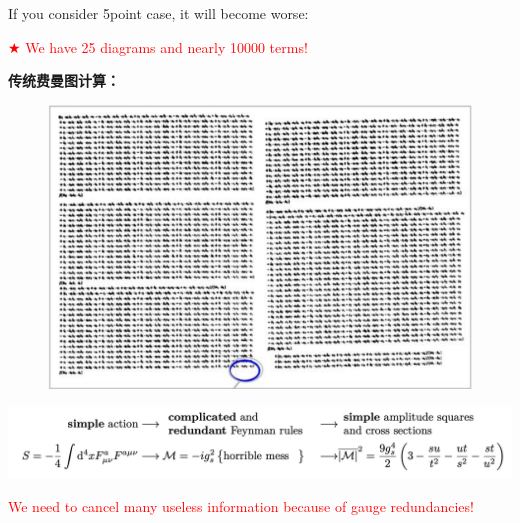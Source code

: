 \documentclass{beamer}
\begin{document}
\begin{frame}
If you consider 5point case, it will become worse:
\begin{center}
    \textcolor{red}{$\bigstar$ We have 25 diagrams and nearly 10000 terms!}
\end{center}
\vspace{-2em}

    \textbf{传统费曼图计算：}
    \begin{figure}
        \centering
        \includegraphics[width=0.5\linewidth]{5pt.png}
    \end{figure}
\vspace{-1.5em}
\pause
\begin{center}
\hspace*{-0.5em}\includegraphics[width=1.05\textwidth]{structure.png}
\end{center}
\vspace{-1.5em}
\pause
\hspace*{-0.5em}\textcolor{red}{We need to cancel many useless information because of gauge redundancies!}

\end{frame}
\end{document}
